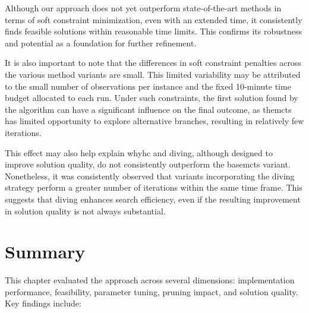 Although our approach does not yet outperform state-of-the-art methods in terms of soft constraint minimization, even with an extended time, it consistently finds feasible solutions within reasonable time limits. This confirms its robustness and potential as a foundation for further refinement.

It is also important to note that the differences in soft constraint penalties across the various method variants are small. This limited variability may be attributed to the small number of observations per instance and the fixed 10-minute time budget allocated to each run. Under such constraints, the first solution found by the algorithm can have a significant influence on the final outcome, as the\ac{mcts} has limited opportunity to explore alternative branches, resulting in relatively few iterations.

This effect may also help explain why\ac{hc} and diving, although designed to improve solution quality, do not consistently outperform the base\ac{mcts} variant. Nonetheless, it was consistently observed that variants incorporating the diving strategy perform a greater number of iterations within the same time frame. This suggests that diving enhances search efficiency, even if the resulting improvement in solution quality is not always substantial.

\section{Summary}

This chapter evaluated the approach across several dimensions: implementation performance, feasibility, parameter tuning, pruning impact, and solution quality. Key findings include:

